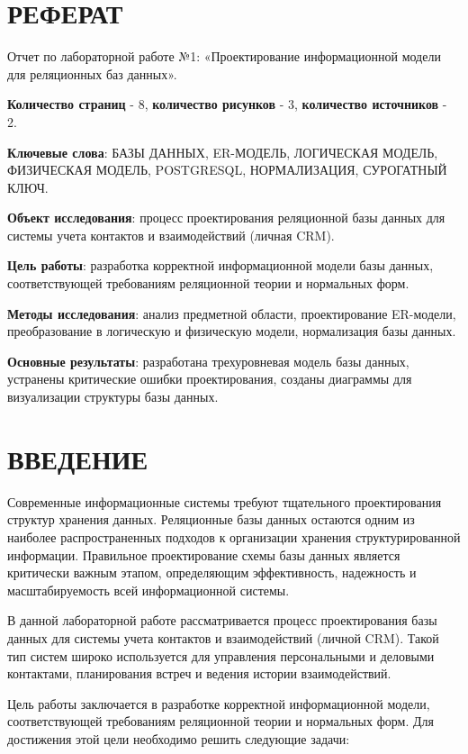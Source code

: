 \documentclass[14pt]{extarticle}
\begin{document}
\section*{РЕФЕРАТ}

Отчет по лабораторной работе №1: «Проектирование информационной модели для реляционных баз данных».

\textbf{Количество страниц} - 8, \textbf{количество рисунков} - 3, \textbf{количество источников} - 2.

\textbf{Ключевые слова}: БАЗЫ ДАННЫХ, ER-МОДЕЛЬ, ЛОГИЧЕСКАЯ МОДЕЛЬ, ФИЗИЧЕСКАЯ МОДЕЛЬ, POSTGRESQL, НОРМАЛИЗАЦИЯ, СУРОГАТНЫЙ КЛЮЧ.

\textbf{Объект исследования}: процесс проектирования реляционной базы данных для системы учета контактов и взаимодействий (личная CRM).

\textbf{Цель работы}: разработка корректной информационной модели базы данных, соответствующей требованиям реляционной теории и нормальных форм.

\textbf{Методы исследования}: анализ предметной области, проектирование ER-модели, преобразование в логическую и физическую модели, нормализация базы данных.

\textbf{Основные результаты}: разработана трехуровневая модель базы данных, устранены критические ошибки проектирования, созданы диаграммы для визуализации структуры базы данных.

\tableofcontents

\section{ВВЕДЕНИЕ}

Современные информационные системы требуют тщательного проектирования структур хранения данных. Реляционные базы данных остаются одним из наиболее распространенных подходов к организации хранения структурированной информации. Правильное проектирование схемы базы данных является критически важным этапом, определяющим эффективность, надежность и масштабируемость всей информационной системы.

В данной лабораторной работе рассматривается процесс проектирования базы данных для системы учета контактов и взаимодействий (личной CRM). Такой тип систем широко используется для управления персональными и деловыми контактами, планирования встреч и ведения истории взаимодействий.

Цель работы заключается в разработке корректной информационной модели, соответствующей требованиям реляционной теории и нормальных форм. Для достижения этой цели необходимо решить следующие задачи:
\end{document}
